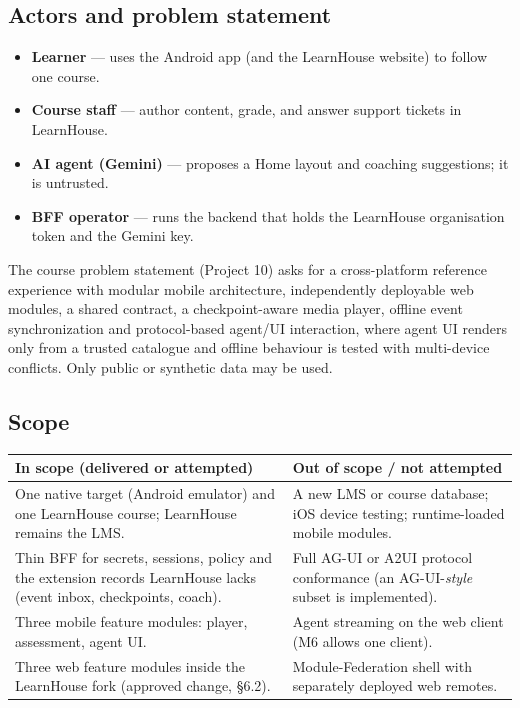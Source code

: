 \documentclass[11pt,a4paper]{article}
\begin{document}
\subsection{Actors and problem statement}
\begin{itemize}
  \item \textbf{Learner} — uses the Android app (and the LearnHouse website) to follow one course.
  \item \textbf{Course staff} — author content, grade, and answer support tickets in LearnHouse.
  \item \textbf{AI agent (Gemini)} — proposes a Home layout and coaching suggestions; it is untrusted.
  \item \textbf{BFF operator} — runs the backend that holds the LearnHouse organisation token and the Gemini key.
\end{itemize}
The course problem statement (Project 10) asks for a cross-platform reference experience with
modular mobile architecture, independently deployable web modules, a shared contract, a
checkpoint-aware media player, offline event synchronization and protocol-based agent/UI interaction,
where agent UI renders only from a trusted catalogue and offline behaviour is tested with multi-device
conflicts. Only public or synthetic data may be used.

\subsection{Scope}
\begin{xltabular}{\textwidth}{L{0.47\textwidth}Y}
\toprule
\textbf{In scope (delivered or attempted)} & \textbf{Out of scope / not attempted} \\
\midrule
One native target (Android emulator) and one LearnHouse course; LearnHouse remains the LMS. &
A new LMS or course database; iOS device testing; runtime-loaded mobile modules. \\
Thin BFF for secrets, sessions, policy and the extension records LearnHouse lacks (event inbox, checkpoints, coach). &
Full AG-UI or A2UI protocol conformance (an AG-UI-\emph{style} subset is implemented). \\
Three mobile feature modules: player, assessment, agent UI. &
Agent streaming on the web client (M6 allows one client). \\
Three web feature modules inside the LearnHouse fork (approved change, §6.2). &
Module-Federation shell with separately deployed web remotes. \\
\bottomrule
\end{xltabular}
\end{document}

